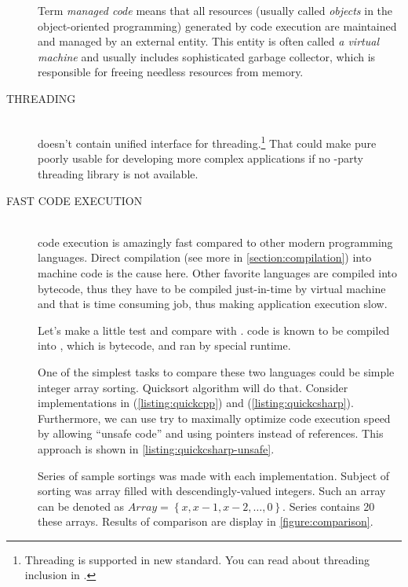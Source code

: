\begin{description}
\begin{fdocextra}
Term \textit{managed code} means that all resources (usually called \emph{objects} in the object-oriented programming) generated by code execution are maintained and managed by an external entity. This entity is often called \emph{a virtual machine} and usually includes sophisticated garbage collector, which is responsible for freeing needless resources from memory.
\end{fdocextra}

\item[THREADING\ts{\textcolor{red}{bad}}]\hfill \\
\cpp doesn't contain unified interface for threading.\footnote{Threading is supported in new  standard. You can read about threading inclusion in \citep[p.~1114-1160]{various:cppstandard}.} That could make pure \cpp poorly usable for developing more complex applications if no -party threading library is not available.

\item[FAST CODE EXECUTION\ts{\textcolor{YellowOrange}{great}}]\hfill \\
\cpp code execution is amazingly fast compared to other modern programming languages. Direct compilation (see more in \autoref{section:compilation})  into machine code is the cause here. Other favorite languages are compiled into bytecode, thus they have to be compiled just-in-time by virtual machine and that is time consuming job, thus making application execution slow.

Let's make a little test and compare \cpp with \csharp. \csharp code is known to be compiled into , which is bytecode, and ran by special runtime.

One of the simplest tasks to compare these two languages could be simple integer array sorting. Quicksort algorithm will do that. Consider implementations in \cpp (\autoref{listing:quickcpp}) and \csharp(\autoref{listing:quickcsharp}). Furthermore, we can use try to maximally optimize \csharp code execution speed by  allowing \enquote{unsafe code} and using pointers instead of references. This approach is shown in \autoref{listing:quickcsharp-unsafe}.

Series of sample sortings was made with each implementation. Subject of sorting was array filled with descendingly-valued integers. Such an array can be denoted as $Array = \left\{ x, x-1, x-2, \ldots, 0 \right\}$. Series contains 20 these arrays. Results of comparison are display in \autoref{figure:comparison}.


\end{description}
